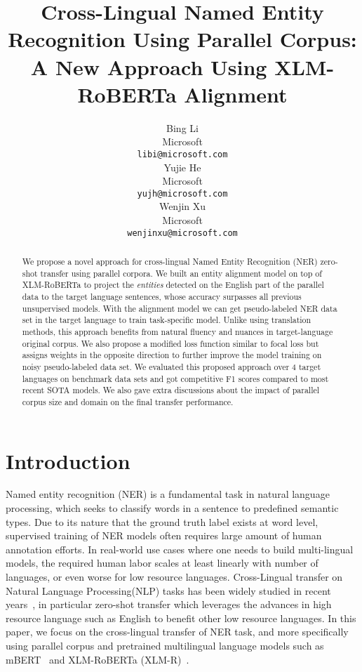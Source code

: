 \documentclass[11pt]{article}
\title{Cross-Lingual Named Entity Recognition Using Parallel Corpus: A New Approach Using XLM-RoBERTa Alignment}
\author{Bing Li \\
	Microsoft \\
	\texttt{libi@microsoft.com} \\\And
	Yujie He \\
	Microsoft \\
	\texttt{yujh@microsoft.com} \\\And
    Wenjin Xu \\
	Microsoft \\
	\texttt{wenjinxu@microsoft.com} \\}
\begin{document}
\maketitle

\begin{abstract}
We propose a novel approach for cross-lingual Named Entity Recognition (NER) zero-shot transfer using parallel corpora. We built an entity alignment model on top of XLM-RoBERTa to project the \emph{entities} detected on the English part of the parallel data to the target language sentences, whose accuracy surpasses all previous unsupervised models. With the alignment model we can get pseudo-labeled NER data set in the target language to train task-specific model. Unlike using translation methods, this approach benefits from natural fluency and nuances in target-language original corpus. We also propose a modified loss function similar to focal loss but assigns weights in the opposite direction to further improve the model training on noisy pseudo-labeled data set. We evaluated this proposed approach over 4 target languages on benchmark data sets and got competitive F1 scores compared to most recent SOTA models. We also gave extra discussions about the impact of parallel corpus size and domain on the final transfer performance.
\end{abstract}

\section{Introduction}
Named entity recognition (NER) is a fundamental task in natural language processing, which seeks to classify words in a sentence to predefined semantic types. Due to its nature that the ground truth label exists at word level, supervised training of NER models often requires large amount of human annotation efforts. In real-world use cases where one needs to build multi-lingual models, the required human labor scales at least linearly with number of languages, or even worse for low resource languages. Cross-Lingual transfer on Natural Language Processing(NLP) tasks has been widely studied in recent years~\cite{conneau-etal-2018-xnli, kim-etal-2017-cross, Ni2017, xie-etal-2018-neural, Ni2019, WuDredze2019, bari2019zero, jain2019entity}, in particular zero-shot transfer which leverages the advances in high resource language such as English to benefit other low resource languages. In this paper, we focus on the cross-lingual transfer of NER task, and more specifically using parallel corpus and pretrained multilingual language models such as mBERT~\cite{multilingualBERTmd} and XLM-RoBERTa (XLM-R)~\cite{lample2019cross, Conneau2020}.
\end{document}
